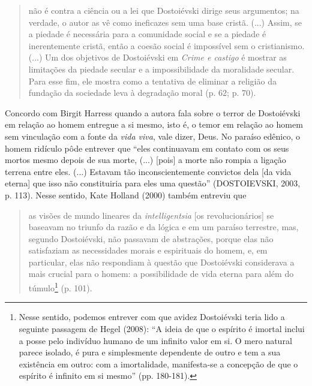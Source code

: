 \begin{quote}
não é contra a ciência ou a lei que Dostoiévski dirige seus argumentos;
na verdade, o autor as vê como ineficazes sem uma base cristã. (...)
Assim, se a piedade é necessária para a comunidade social e se a piedade
é inerentemente cristã, então a coesão social é impossível sem o
cristianismo. (...) Um dos objetivos de Dostoiévski em \emph{Crime e
castigo} é mostrar as limitações da piedade secular e a impossibilidade
da moralidade secular. Para esse fim, ele mostra como a tentativa de
eliminar a religião da fundação da sociedade leva à degradação moral (p.
62; p. 70).
\end{quote}

Concordo com Birgit Harress quando a autora fala sobre o terror de
Dostoiévski em relação ao homem entregue a si mesmo, isto é, o temor em
relação ao homem sem vinculação com a fonte da \emph{vida viva}, vale
dizer, Deus. No paraíso edênico, o homem ridículo pôde entrever que
``eles continuavam em contato com os seus mortos mesmo depois de sua
morte, (...) {[}pois{]} a morte não rompia a ligação terrena entre eles.
(...) Estavam tão inconscientemente convictos dela {[}da vida eterna{]}
que isso não constituiria para eles uma questão'' (DOSTOIEVSKI, 2003, p.
113). Nesse sentido, Kate Holland (2000) também entreviu que

\begin{quote}
as visões de mundo lineares da \emph{intelligentsia} {[}os
revolucionários{]} se baseavam no triunfo da razão e da lógica e em um
paraíso terrestre, mas, segundo Dostoiévski, não passavam de abstrações,
porque elas não satisfaziam as necessidades morais e espirituais do
homem, e, em particular, elas não respondiam à questão que Dostoiévski
considerava a mais crucial para o homem: a possibilidade de vida eterna
para além do túmulo\footnote{Nesse sentido, podemos entrever com que
  avidez Dostoiévski teria lido a seguinte passagem de Hegel (2008): ``A
  ideia de que o espírito é imortal inclui a posse pelo indivíduo humano
  de um infinito valor em si. O mero natural parece isolado, é pura e
  simplesmente dependente de outro e tem a sua existência em outro: com
  a imortalidade, manifesta-se a concepção de que o espírito é infinito
  em si mesmo'' (pp. 180-181).} (p. 101).
\end{quote}

